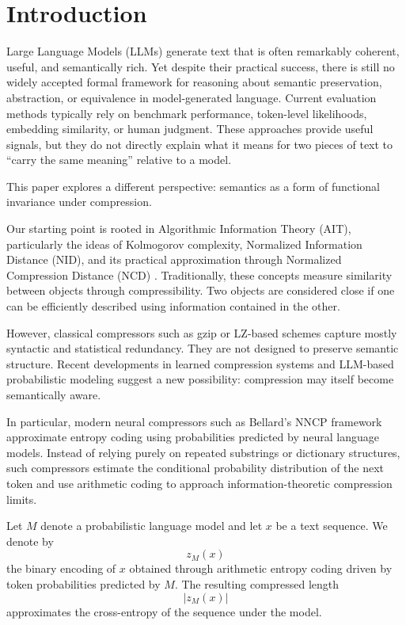 \section{Introduction}

Large Language Models (LLMs) generate text that is often remarkably coherent, useful, and semantically rich. Yet despite their practical success, there is still no widely accepted formal framework for reasoning about semantic preservation, abstraction, or equivalence in model-generated language. Current evaluation methods typically rely on benchmark performance, token-level likelihoods, embedding similarity, or human judgment. These approaches provide useful signals, but they do not directly explain what it means for two pieces of text to ``carry the same meaning'' relative to a model.

This paper explores a different perspective: semantics as a form of functional invariance under compression.

Our starting point is rooted in Algorithmic Information Theory (AIT), particularly the ideas of Kolmogorov complexity, Normalized Information Distance (NID), and its practical approximation through Normalized Compression Distance (NCD) \cite{li2004similarity,cilibrasi2005clustering}. Traditionally, these concepts measure similarity between objects through compressibility. Two objects are considered close if one can be efficiently described using information contained in the other.

However, classical compressors such as gzip or LZ-based schemes capture mostly syntactic and statistical redundancy. They are not designed to preserve semantic structure. Recent developments in learned compression systems and LLM-based probabilistic modeling suggest a new possibility: compression may itself become semantically aware.

In particular, modern neural compressors such as Bellard's NNCP framework \cite{bellard2024nncp} approximate entropy coding using probabilities predicted by neural language models. Instead of relying purely on repeated substrings or dictionary structures, such compressors estimate the conditional probability distribution of the next token and use arithmetic coding to approach information-theoretic compression limits.

Let $M$ denote a probabilistic language model and let $x$ be a text sequence. We denote by
\[
z_M(x)
\]
the binary encoding of $x$ obtained through arithmetic entropy coding driven by token probabilities predicted by $M$. The resulting compressed length
\[
|z_M(x)|
\]
approximates the cross-entropy of the sequence under the model.

